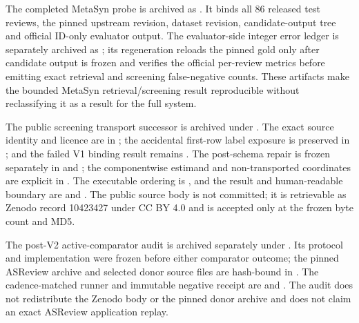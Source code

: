 The completed MetaSyn probe is archived as
.  It binds
all 86 released test reviews, the pinned upstream revision, dataset revision,
candidate-output tree and official ID-only evaluator output.  The evaluator-side
integer error ledger is separately archived as
; its regeneration reloads the
pinned gold only after candidate output is frozen and verifies the official
per-review metrics before emitting exact retrieval and screening false-negative
counts.  These artifacts make the bounded MetaSyn retrieval/screening result
reproducible without reclassifying it as a result for the full system.

The public screening transport successor is archived under
.  The exact source
identity and licence are in ; the accidental first-row
label exposure is preserved in ; and the
failed V1 binding result remains .  The post-schema
repair is frozen separately in  and
; the componentwise estimand and
non-transported coordinates are explicit in
. The executable ordering is
, and the result and human-readable boundary
are  and .  The public source body
is not committed; it is retrievable as Zenodo record 10423427 under CC BY 4.0
and is accepted only at the frozen byte count and MD5.

The post-V2 active-comparator audit is archived separately under
. Its protocol
and implementation were frozen before either comparator outcome; the pinned
ASReview archive and selected donor source files are hash-bound in
. The cadence-matched runner and immutable
negative receipt are  and
. The audit does not redistribute the Zenodo body or the
pinned donor archive and does not claim an exact ASReview application replay.

